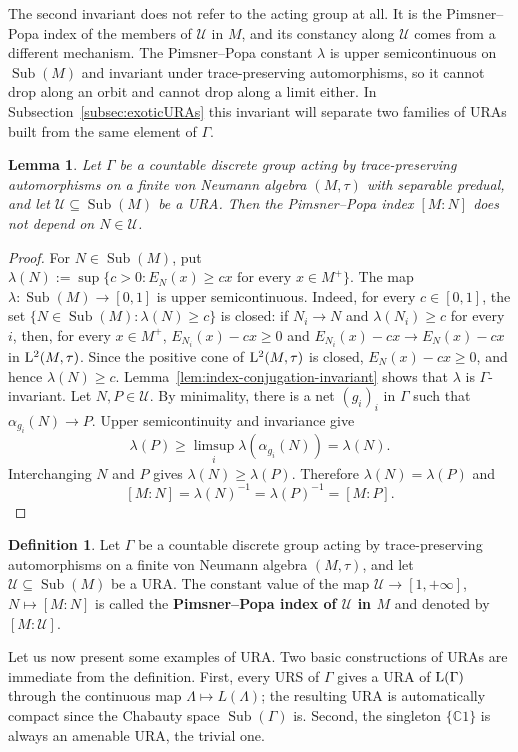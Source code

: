 \documentclass[12pt]{amsart} %
\theoremstyle{plain}
\newtheorem{lemma}[theorem]{Lemma}
\theoremstyle{definition}
\newtheorem{definition}[theorem]{Definition}
\newcommand{\C}{\mathbb{C}}
\newcommand{\LL}{{\rm L}}
\newcommand{\Ucal}{\mathcal{U}}
\DeclareMathOperator{\Sub}{Sub}
\begin{document}
\noindent The second invariant does not refer to the acting group at all. It is
the Pimsner--Popa index of the members of $\Ucal$ in $M$, and its constancy along
$\Ucal$ comes from a different mechanism. The Pimsner--Popa constant $\lambda$ is
upper semicontinuous on $\Sub(M)$ and invariant under trace-preserving
automorphisms, so it cannot drop along an orbit and cannot drop along a limit
either. In Subsection~\ref{subsec:exoticURAs} this invariant will separate two
families of URAs built from the same element of $\Gamma$.
\medskip

\begin{lemma}\label{lem:pimsner-popa-index-of-ura}
Let $\Gamma$ be a countable discrete group acting by trace-preserving
automorphisms on a finite von Neumann algebra $(M,\tau)$ with separable
predual, and let $\mathcal U\subseteq\Sub(M)$ be a URA. Then the Pimsner--Popa index
$[M:N]$ does not depend on $N\in\mathcal U$.
\end{lemma}
\begin{proof}
For $N\in\Sub(M)$, put $\lambda(N):=\sup\{c>0:E_N(x)\geq cx\text{ for every }x\in M^+\}$. The map $\lambda:\Sub(M)\to[0,1]$ is upper semicontinuous. Indeed, for
every $c\in[0,1]$, the set $\{N\in\Sub(M):\lambda(N)\geq c\}$ is closed: if $N_i\to N$ and $\lambda(N_i)\geq c$ for every $i$, then,
for every $x\in M^+$, $E_{N_i}(x)-cx\geq0$ and $E_{N_i}(x)-cx\to E_N(x)-cx$ in $\LL^2(M,\tau)$. Since the positive cone of $\LL^2(M,\tau)$ is closed,
$E_N(x)-cx\geq0$, and hence $\lambda(N)\geq c$.
\medskip
\noindent Lemma~\ref{lem:index-conjugation-invariant} shows that $\lambda$ is
$\Gamma$-invariant. Let $N,P\in\mathcal U$. By minimality, there is a net
$(g_i)_i$ in $\Gamma$ such that $\alpha_{g_i}(N)\to P$. Upper
semicontinuity and invariance give
$$
\lambda(P)\geq\limsup_i\lambda(\alpha_{g_i}(N))=\lambda(N).
$$
Interchanging $N$ and $P$ gives $\lambda(N)\geq\lambda(P)$. Therefore
$\lambda(N)=\lambda(P)$ and
$$
[M:N]=\lambda(N)^{-1}=\lambda(P)^{-1}=[M:P].
$$\end{proof}
\begin{definition}\label{def:pimsner-popa-index-of-ura}
Let $\Gamma$ be a countable discrete group acting by trace-preserving
automorphisms on a finite von Neumann algebra $(M,\tau)$, and let
$\mathcal U\subseteq\Sub(M)$ be a URA. The constant value of the map $\Ucal\to[1,+\infty]$, $N\mapsto [M:N]$ is called the
\textbf{Pimsner--Popa index of $\mathcal U$ in $M$} and denoted by $
[M:\mathcal U]$.
\end{definition}
\noindent Let us now present some examples of URA. Two basic constructions of URAs are immediate from the definition. First, every URS of $\Gamma$ gives a URA of ${\rm L}(\Gamma)$ through the continuous map $\Lambda \mapsto L(\Lambda)$; the resulting URA is automatically compact since the Chabauty space $\Sub(\Gamma)$ is. Second, the singleton $\{\C 1\}$ is always an amenable URA, the trivial one. 
\end{document}
